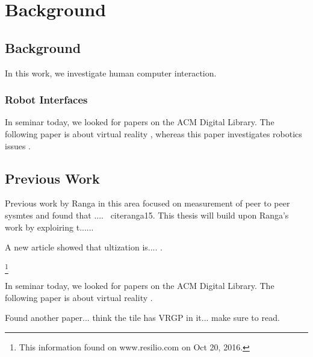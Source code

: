 \chapter{Background}
\label{chap:background}

\section{Background}

In this work, we investigate human computer interaction. 

\subsection{Robot Interfaces}

In seminar today, we looked for papers on the ACM Digital Library. The
following paper is about virtual reality \parencite{Kreylos:2006:ESW:1128923.1128948}, whereas this paper investigates robotics issues \parencite{Drascic89}.

\section{Previous Work}

Previous work by Ranga in this area focused on measurement of peer to peer sysmtes and found that .... ~cite{ranga15}. This thesis will build upon Ranga's work by exploiring t......

A new article showed that ultization is.... \cite{Abbasi:2013:DBS:2507924.2507961}.

\cite{website1}

\footnote{This information found on www.resilio.com on Oct 20, 2016.}

In seminar today, we looked for papers on the ACM Digital Library. The
following paper is about virtual reality
\cite{Kreylos:2006:ESW:1128923.1128948}.

Found another paper... think the tile has VRGP in it... make sure to read.





